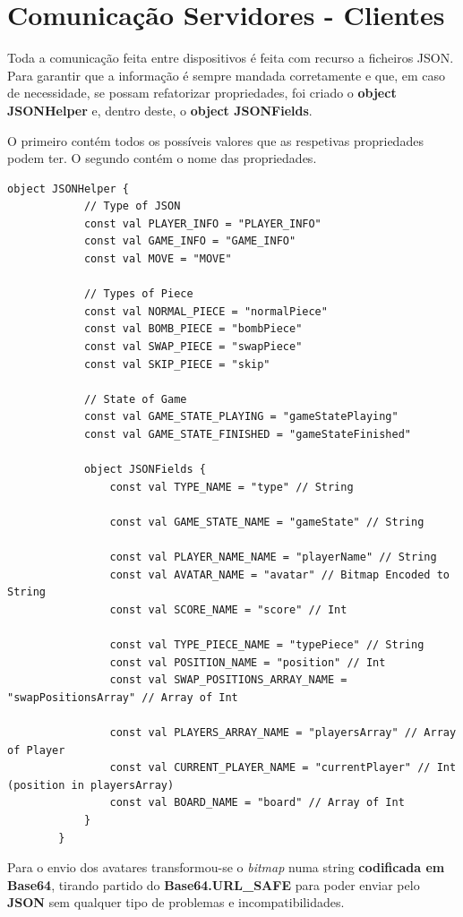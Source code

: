 \documentclass[11pt]{article}
\begin{document}
	
	\large
	\section{Comunicação Servidores - Clientes}
	\normalsize
	
	Toda a comunicação feita entre dispositivos é feita com recurso a ficheiros JSON. Para garantir que a informação é sempre mandada corretamente e que, em caso de necessidade, se possam refatorizar propriedades, foi criado o \textbf{object JSONHelper} e, dentro deste, o \textbf{object JSONFields}.
	
	O primeiro contém todos os possíveis valores que as respetivas propriedades podem ter. O segundo contém o nome das propriedades.
	
	\begin{lstlisting}[caption=object JSONHelper]
		object JSONHelper {
			// Type of JSON
			const val PLAYER_INFO = "PLAYER_INFO"
			const val GAME_INFO = "GAME_INFO"
			const val MOVE = "MOVE"
			
			// Types of Piece
			const val NORMAL_PIECE = "normalPiece"
			const val BOMB_PIECE = "bombPiece"
			const val SWAP_PIECE = "swapPiece"
			const val SKIP_PIECE = "skip"
			
			// State of Game
			const val GAME_STATE_PLAYING = "gameStatePlaying"
			const val GAME_STATE_FINISHED = "gameStateFinished"
			
			object JSONFields {
				const val TYPE_NAME = "type" // String
				
				const val GAME_STATE_NAME = "gameState" // String
				
				const val PLAYER_NAME_NAME = "playerName" // String
				const val AVATAR_NAME = "avatar" // Bitmap Encoded to String
				const val SCORE_NAME = "score" // Int
				
				const val TYPE_PIECE_NAME = "typePiece" // String
				const val POSITION_NAME = "position" // Int
				const val SWAP_POSITIONS_ARRAY_NAME = "swapPositionsArray" // Array of Int
				
				const val PLAYERS_ARRAY_NAME = "playersArray" // Array of Player
				const val CURRENT_PLAYER_NAME = "currentPlayer" // Int (position in playersArray)
				const val BOARD_NAME = "board" // Array of Int
			}
		}
	\end{lstlisting}

	Para o envio dos avatares transformou-se o \textit{bitmap} numa string \textbf{codificada em Base64}, tirando partido do \textbf{Base64.URL\_SAFE} para poder enviar pelo \textbf{JSON} sem qualquer tipo de problemas e incompatibilidades.
	
\end{document}
